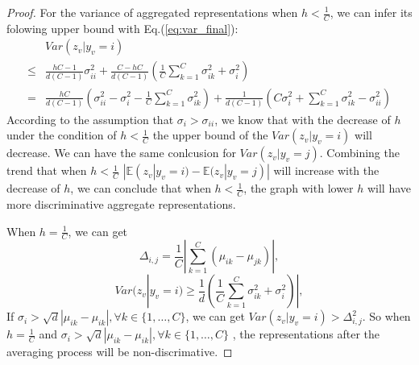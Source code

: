 \begin{proof}
For the variance of aggregated representations when $h < \frac{1}{C}$, we can infer its folowing upper bound with Eq.(\ref{eq:var_final}):
\begin{equation}
\begin{aligned}
    & Var({z}_v|y_v=i) \\
    \leq & \frac{hC-1}{d(C-1)}\sigma_{ii}^2 + \frac{C-hC}{d(C-1)}(\frac{1}{C}\sum_{k=1}^C\sigma_{ik}^2 + \sigma_i^2) \\
    = & \frac{hC}{d(C-1)}(\sigma_{ii}^2 - \sigma_i^2- \frac{1}{C}\sum_{k=1}^{C}\sigma_{ik}^2) 
    +  \frac{1}{d(C-1)}(C\sigma_i^2 + \sum_{k=1}^C\sigma_{ik}^2 - \sigma_{ii}^2)
\end{aligned}
\end{equation}
According to the assumption that $\sigma_i> \sigma_{ii}$, we know that with the decrease of $h$ under the condition of $h < \frac{1}{C}$ the upper bound of the $Var({z}_v|y_v=i)$ will decrease. We can have the same conlcusion for $Var({z}_v|y_v=j)$. Combining the trend that when $h < \frac{1}{C}$ $|\mathbb{E}({z}_{v}|y_v=i)-\mathbb{E}({z}_{v}|y_v=j)|$ will increase with the decrease of $h$, we can conclude that when $h < \frac{1}{C}$, the graph with lower $h$ will have more discriminative aggregate representations. 

When $h=\frac{1}{C}$, we can get
\begin{equation}
    \Delta_{i,j} = \frac{1}{C}|\sum_{k=1}^C(\mu_{ik}-\mu_{jk})|,
\end{equation}
\begin{equation}
    Var({z}_v|y_v=i) \geq \frac{1}{d}(\frac{1}{C}\sum_{k=1}^C\sigma_{ik}^2 + \sigma_i^2)|,
\end{equation}
If $\sigma_i > \sqrt{d}|\mu_{ik}-\mu_{ik}|, \forall k \in \{1,\dots, C\}$, we can get $Var({z}_v|y_v=i)>\Delta_{i,j}^2$. So when $h=\frac{1}{C}$ and $\sigma_i > \sqrt{d}|\mu_{ik}-\mu_{ik}|, \forall k \in \{1,\dots, C\}$ , the representations after the averaging process will be non-discrimative.

\end{proof}



